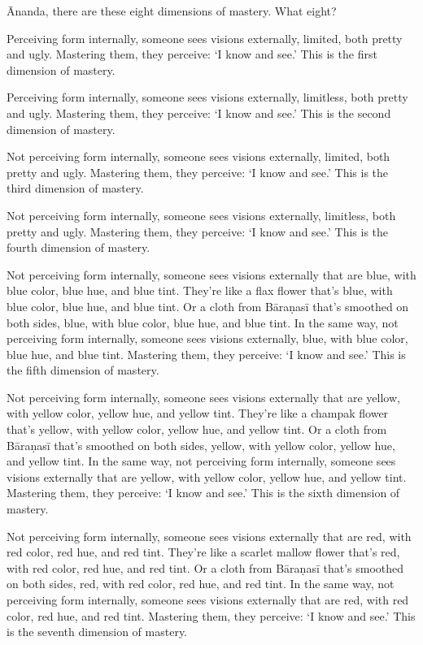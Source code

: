 \documentclass[12pt,openany]{book}%
\begin{document}
Ānanda, there are these eight dimensions of mastery. What eight? 

Perceiving form internally, someone sees visions externally, limited, both pretty and ugly. Mastering them, they perceive: ‘I know and see.’ This is the first dimension of mastery. 

Perceiving form internally, someone sees visions externally, limitless, both pretty and ugly. Mastering them, they perceive: ‘I know and see.’ This is the second dimension of mastery. 

Not perceiving form internally, someone sees visions externally, limited, both pretty and ugly. Mastering them, they perceive: ‘I know and see.’ This is the third dimension of mastery. 

Not perceiving form internally, someone sees visions externally, limitless, both pretty and ugly. Mastering them, they perceive: ‘I know and see.’ This is the fourth dimension of mastery. 

Not perceiving form internally, someone sees visions externally that are blue, with blue color, blue hue, and blue tint. They’re like a flax flower that’s blue, with blue color, blue hue, and blue tint. Or a cloth from \textsanskrit{Bāraṇasī} that’s smoothed on both sides, blue, with blue color, blue hue, and blue tint. In the same way, not perceiving form internally, someone sees visions externally, blue, with blue color, blue hue, and blue tint. Mastering them, they perceive: ‘I know and see.’ This is the fifth dimension of mastery. 

Not perceiving form internally, someone sees visions externally that are yellow, with yellow color, yellow hue, and yellow tint. They’re like a champak flower that’s yellow, with yellow color, yellow hue, and yellow tint. Or a cloth from \textsanskrit{Bāraṇasī} that’s smoothed on both sides, yellow, with yellow color, yellow hue, and yellow tint. In the same way, not perceiving form internally, someone sees visions externally that are yellow, with yellow color, yellow hue, and yellow tint. Mastering them, they perceive: ‘I know and see.’ This is the sixth dimension of mastery. 

Not perceiving form internally, someone sees visions externally that are red, with red color, red hue, and red tint. They’re like a scarlet mallow flower that’s red, with red color, red hue, and red tint. Or a cloth from \textsanskrit{Bāraṇasī} that’s smoothed on both sides, red, with red color, red hue, and red tint. In the same way, not perceiving form internally, someone sees visions externally that are red, with red color, red hue, and red tint. Mastering them, they perceive: ‘I know and see.’ This is the seventh dimension of mastery. 
\end{document}
